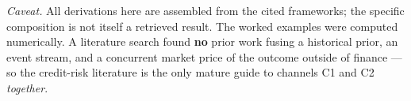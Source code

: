 \documentclass[11pt,a4paper]{article}
\theoremstyle{plain}
\begin{document}
\fussy
\normalsize
\vspace{0.3cm}
\noindent\emph{Caveat.} All derivations here are assembled from the cited frameworks; the specific
composition is not itself a retrieved result. The worked examples were computed numerically. A
literature search found \textbf{no} prior work fusing a historical prior, an event stream, and a
concurrent market price of the outcome outside of finance --- so the credit-risk literature is the
only mature guide to channels C1 and C2 \emph{together}.
\end{document}
